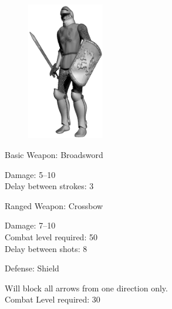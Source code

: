 \begin{figure}
	\begin{center}
		\vspace{-20pt}
		\includegraphics[width=0.3\textwidth]{Anorman}
	\end{center}
	\vspace{-20pt}
\end{figure}

Basic Weapon: Broadsword
\begin{adjustwidth}{1cm}{}
	Damage: 5–10 \\
	Delay between strokes: 3
\end{adjustwidth}
Ranged Weapon: Crossbow
\begin{adjustwidth}{1cm}{}
	Damage: 7–10 \\
	Combat level required: 50 \\
	Delay between shots: 8
\end{adjustwidth}
Defense: Shield
\begin{adjustwidth}{1cm}{}
	Will block all arrows from one direction only. \\
	Combat Level required: 30 
\end{adjustwidth}

